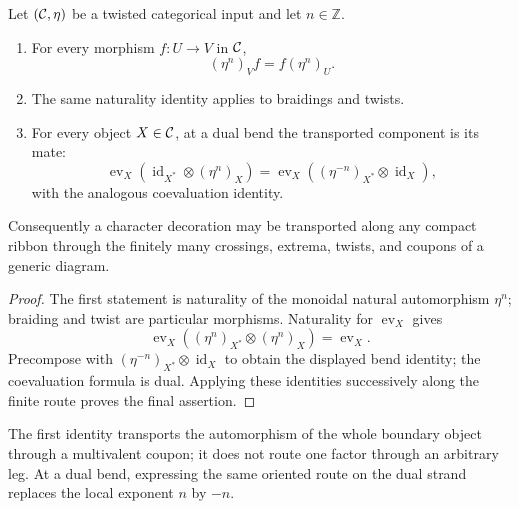 \begin{lemma}
\label{lem:finite-coupon-transport}
Let \((\mathcal{C},\eta)\) be a twisted categorical input and let
$n\in\mathbb Z$.
\begin{enumerate}[label=(\roman*),ref=\roman*]
  \item For every morphism $f\colon U\to V$ in \(\mathcal{C}\),
  \[
    (\eta^n)_Vf=f(\eta^n)_U.
  \]

  \item The same naturality identity applies to braidings and twists.

  \item For every object \(X\in\mathcal{C}\), at a dual bend the transported
  component is its mate:
  \[
    \operatorname{ev}_X
      (\operatorname{id}_{X^*}\otimes(\eta^n)_X)
    =
    \operatorname{ev}_X
      ((\eta^{-n})_{X^*}\otimes\operatorname{id}_X),
  \]
  with the analogous coevaluation identity.
\end{enumerate}
Consequently a character decoration may be transported along any compact
ribbon through the finitely many crossings, extrema, twists, and coupons of
a generic diagram.
\end{lemma}

\begin{proof}
The first statement is naturality of the monoidal natural automorphism
$\eta^n$; braiding and twist are particular morphisms.  Naturality for
$\operatorname{ev}_X$ gives
\[
 \operatorname{ev}_X
 ((\eta^n)_{X^*}\otimes(\eta^n)_X)=\operatorname{ev}_X.
\]
Precompose with $(\eta^{-n})_{X^*}\otimes\operatorname{id}_X$ to obtain the
displayed bend identity; the coevaluation formula is dual.  Applying these
identities successively along the finite route proves the final assertion.
\end{proof}

\begin{remark}
\label{rem:coupon-naturality-scope}
The first identity transports the automorphism of the whole boundary object
through a multivalent coupon; it does not route one factor through an
arbitrary leg.  At a dual bend, expressing the same oriented route on the
dual strand replaces the local exponent \(n\) by \(-n\).
\end{remark}

